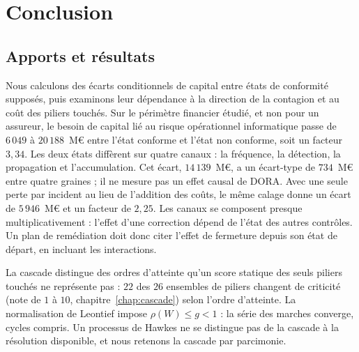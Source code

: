 ﻿%

\chapter*{Conclusion}
{}

\section*{Apports et résultats}
Nous calculons des écarts conditionnels de capital entre états de conformité supposés, puis
examinons leur dépendance à la direction de la contagion et au coût des piliers touchés. Sur le
périmètre financier étudié, et non pour un assureur, le besoin de capital lié au risque
opérationnel informatique passe de $6\,049$ à $20\,188$~M\euro{} entre l'état conforme et
l'état non conforme, soit un facteur $3{,}34$. Les deux états diffèrent sur quatre canaux : la
fréquence, la détection, la propagation et l'accumulation. Cet écart, $14\,139$~M\euro{}, a un écart-type de
$734$~M\euro{} entre quatre graines ; il ne mesure pas un effet causal de DORA. Avec une seule perte par incident au lieu de l'addition des coûts, le même calage donne un écart de $5\,946$~M\euro{} et un facteur de $2{,}25$.
Les canaux se composent presque multiplicativement : l'effet d'une correction dépend de
l'état des autres contrôles. Un plan de remédiation doit donc citer l'effet de fermeture
depuis son état de départ, en incluant les interactions.

La cascade distingue des ordres d'atteinte qu'un score statique des seuls piliers touchés ne représente pas :
$22$ des $26$ ensembles de piliers changent de criticité (note de $1$ à $10$, chapitre~\ref{chap:cascade}) selon l'ordre d'atteinte.
La normalisation de Leontief impose $\rho(W)\le g<1$ : la série des marches converge, cycles compris. Un processus de Hawkes
ne se distingue pas de la cascade à la résolution disponible, et nous retenons la cascade par parcimonie.


